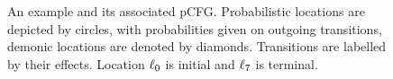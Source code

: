 \begin{figure}[t]
\begin{subfigure}{0.45\textwidth}
\begin{tikzpicture}

\end{tikzpicture}
\end{subfigure}
\caption{An example \APP{} and its associated 
pCFG. Probabilistic locations are depicted by circles, with probabilities given 
on outgoing 
transitions, demonic locations are denoted by diamonds. Transitions are 
labelled by their effects. Location $\loc_0$ is 
initial and $\loc_7$ is terminal.}
\label{fig:invariant-running}
\end{figure}

